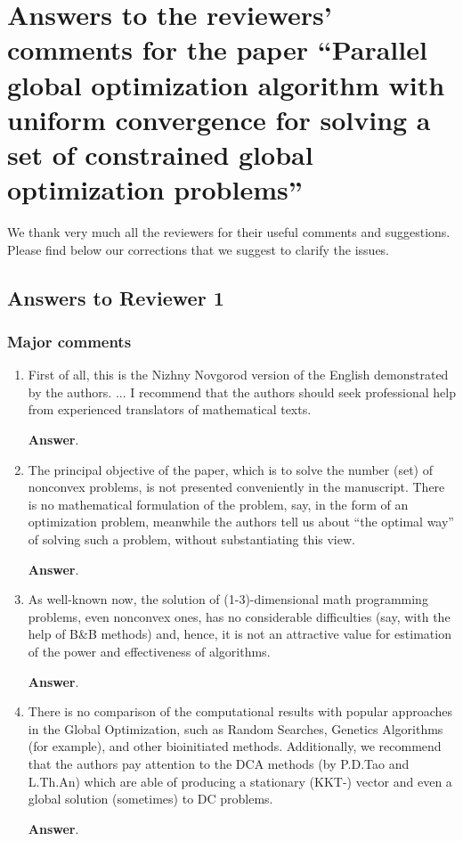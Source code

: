 \documentclass{article}%
\begin{document}
\section*{Answers to the reviewers' comments for the paper ``Parallel global optimization algorithm with uniform convergence for solving a set of constrained global optimization problems''}


We thank very much all the reviewers for their useful comments and suggestions.
Please find below our corrections that we suggest to clarify the issues.

\phantom{f}

\subsection*{Answers to Reviewer 1}

\subsubsection*{Major comments}

\begin{enumerate}
\item 
First of all, this is the Nizhny Novgorod version of the English demonstrated by the authors. ... I recommend that the authors should seek professional help from experienced translators of mathematical texts. 

\textbf{Answer}. 

\item The principal objective of the paper, which is to solve the number (set) of nonconvex problems, is not presented conveniently in the manuscript. There is no mathematical formulation of the problem, say, in the form of an optimization problem, meanwhile the authors tell us about “the optimal way” of solving such a problem, without substantiating this view.

\textbf{Answer}.

\item As well-known now, the solution of (1-3)-dimensional math programming problems, even nonconvex ones, has no considerable difficulties (say, with the help of B\&B methods) and, hence, it is not an attractive value for estimation of the power and effectiveness of algorithms.

\textbf{Answer}. 

\item There is no comparison of the computational results with popular approaches in the Global Optimization, such as Random Searches, Genetics Algorithms (for example), and other bioinitiated methods.
Additionally, we recommend that the authors pay attention to the DCA methods (by P.D.Tao and L.Th.An) which are able of producing a stationary (KKT-) vector and even a global solution (sometimes) to DC problems.

\textbf{Answer}.

\end{enumerate}
\end{document}
